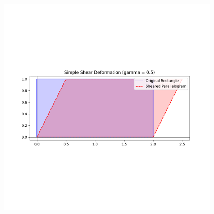 \documentclass[journal]{IEEEtran}
\begin{document}
\begin{figure}[H]
    \centering
    \includegraphics[width=0.8\columnwidth]{figs/Figure_1.png}
    \label{fig:1}
\end{figure}
\end{document}
